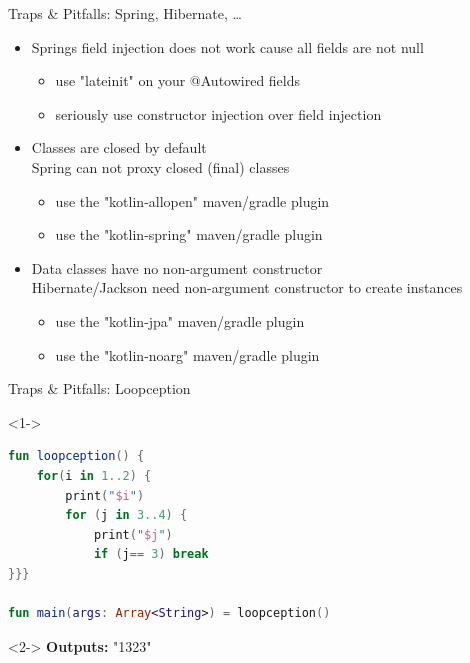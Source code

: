 \begin{frame}{Traps \& Pitfalls: Spring, Hibernate, \dots}
	\begin{itemize}
		\item Springs field injection does not work cause all fields are not null
		\begin{itemize}
			\item use "lateinit" on your @Autowired fields
			\item seriously use constructor injection over field injection
		\end{itemize}
		\item Classes are closed by default\\
		Spring can not proxy closed (final) classes
		\begin{itemize}
			\item use the "kotlin-allopen" maven/gradle plugin
			\item use the "kotlin-spring" maven/gradle plugin
		\end{itemize}
		\item Data classes have no non-argument constructor\\
		Hibernate/Jackson need non-argument constructor to create instances
		\begin{itemize}
			\item use the "kotlin-jpa" maven/gradle plugin
			\item use the "kotlin-noarg" maven/gradle plugin
		\end{itemize}
	\end{itemize}
\end{frame}

\begin{frame}[fragile]{Traps \& Pitfalls: Loopception}
	\begin{onlyenv}<1->
		\begin{lstlisting}[language=Kotlin]
fun loopception() {
	for(i in 1..2) {
		print("$i")
		for (j in 3..4) {
			print("$j")
			if (j== 3) break
}}}

fun main(args: Array<String>) = loopception()
		\end{lstlisting}
	\end{onlyenv}
	\begin{onlyenv}<2->
		\textbf{Outputs:} "1323"
	\end{onlyenv}
\end{frame}

